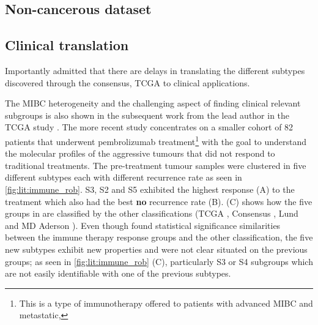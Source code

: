 \subsection{Non-cancerous dataset}






\subsection{Clinical translation}

Importantly \citet{Kamoun2020-tj} admitted that there are delays in translating the different subtypes discovered through the consensus, TCGA to clinical applications. 

The MIBC heterogeneity and the challenging aspect of finding clinical relevant subgroups is also shown in the subsequent work \citet{Robertson2023-na} from the lead author in the TCGA study \cite{Robertson2017-mg}. The more recent study concentrates on a smaller cohort of 82 patients that underwent pembrolizumab treatment\footnote{This is a type of immunotherapy offered to patients with advanced MIBC and metastatic,} with the goal to understand the molecular profiles of the aggressive tumours that did not respond to traditional treatments. The pre-treatment tumour samples were clustered in five different subtypes each with different recurrence rate as seen in \cref{fig:lit:immune_rob}. S3, S2 and S5 exhibited the highest response (A) to the treatment which also had the best \textbf{no} recurrence rate (B).  (C) shows how the five groups in \cite{Robertson2023-na} are classified by the other classifications (TCGA \cite{Robertson2017-mg}, Consensus \cite{Kamoun2020-tj}, Lund \cite{Marzouka2018-ge} and MD Aderson \cite{Dadhania2016-cb}). Even though \citet{Robertson2023-na} found statistical significance similarities between the immune therapy response groups and the other classification, the five new subtypes exhibit new properties and were not clear situated on the previous groups; as seen in \cref{fig:lit:immune_rob} (C), particularly S3 or S4 subgroups which are not easily identifiable with one of the previous subtypes.



